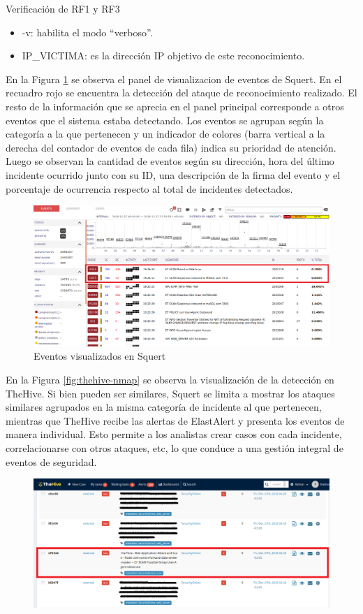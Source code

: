 \begin{section}{Verificación de RF1 y RF3}
\begin{itemize}
    \item -v: habilita el modo “verboso”.
    \item IP\_VICTIMA: es la dirección IP objetivo de este reconocimiento.
    \end{itemize}
    En la Figura \ref{fig:squert-nmap} se observa el panel de visualizacion de eventos de Squert.  En el recuadro rojo se encuentra la detección del ataque de reconocimiento realizado. El resto de la información que se aprecia en el panel principal corresponde a otros eventos que el sistema estaba detectando. Los eventos se agrupan según la categoría a la que pertenecen y un indicador de colores (barra vertical a la derecha del contador de eventos de cada fila) indica su prioridad de atención. %
    Luego se observan la cantidad de eventos según su dirección, hora del último incidente ocurrido junto con su ID, una descripción de la firma del evento y el porcentaje de ocurrencia respecto al total de incidentes detectados.
    \begin{figure}[H]
    \centering
    \includegraphics[width=1\textwidth]{./iteracion_1_imagenes/Squert_NMAP.png}
    \caption{Eventos visualizados en Squert}
    \label{fig:squert-nmap}
    \end{figure}
    \FloatBarrier
    En la Figura \ref{fig:thehive-nmap} se observa la visualización de la detección en TheHive. Si bien pueden ser similares, Squert se limita a mostrar los ataques similares agrupados en la misma categoría de incidente al que pertenecen, mientras que TheHive recibe las alertas de ElastAlert y presenta los eventos de manera individual. Esto permite a los analistas crear casos con cada incidente, correlacionarse con otros ataques, etc, lo que conduce a una gestión integral de eventos de seguridad.
    \begin{figure}[H]
    \centering
    \includegraphics[width=1\textwidth]{./iteracion_1_imagenes/TheHive-NMAPEditado.png}

\end{figure}
\end{section}

